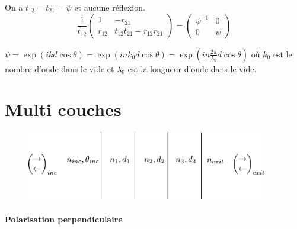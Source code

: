 \documentclass[a4paper,english]{article}
\begin{document}
On a $t_{12} = t_{21} = \psi$ et aucune réflexion.
\begin{equation}\label{mfresp}
\frac{1}{t_{12}}\begin{pmatrix} 1 & -r_{21} \\ r_{12} & t_{12}t_{21} - r_{12}r_{21} \end{pmatrix} = \begin{pmatrix} \psi^{-1} & 0 \\ 0 & \psi \end{pmatrix}
\end{equation}

$\psi = \exp(i k d \cos \theta) = \exp(i n k_0 d \cos \theta) = \exp(i n \frac{2\pi}{\lambda_0} d \cos \theta)$ où $k_0$ est le nombre d'onde dans le vide et $\lambda_0$ est la longueur d'onde dans le vide.
















\section{Multi couches}

\begin{figure}[H]
	\centering
	\includegraphics[height=3cm]{Figures/film.pdf}
\end{figure}
\paragraph{Polarisation perpendiculaire}
\end{document}
